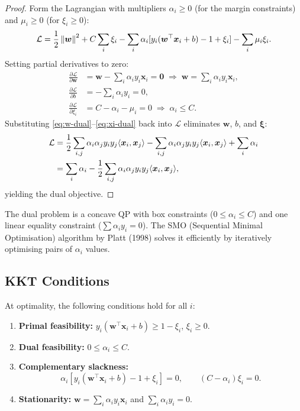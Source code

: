 \begin{proof}
Form the Lagrangian with multipliers $\alpha_i \geq 0$ (for the margin constraints) and $\mu_i \geq 0$ (for $\xi_i \geq 0$):
\[
    \mathcal{L} = \frac{1}{2}\left\| \bm{w} \right\|^2 + C\sum_i\xi_i
    - \sum_i\alpha_i[y_i(\bm{w}^\top\bm{x}_i+b)-1+\xi_i]
    - \sum_i\mu_i\xi_i.
\]
Setting partial derivatives to zero:
\begin{align}
    \frac{\partial\mathcal{L}}{\partial\bm{w}} &= \bm{w} - \sum_i\alpha_i y_i\bm{x}_i = \bm{0}
    \;\Longrightarrow\; \bm{w} = \sum_i\alpha_i y_i\bm{x}_i, \label{eq:w-dual}\\
    \frac{\partial\mathcal{L}}{\partial b} &= -\sum_i\alpha_i y_i = 0, \label{eq:b-dual}\\
    \frac{\partial\mathcal{L}}{\partial\xi_i} &= C - \alpha_i - \mu_i = 0
    \;\Longrightarrow\; \alpha_i \leq C. \label{eq:xi-dual}
\end{align}
Substituting \eqref{eq:w-dual}--\eqref{eq:xi-dual} back into $\mathcal{L}$ eliminates $\bm{w}$, $b$, and $\bm{\xi}$:
\begin{align*}
    \mathcal{L} &= \frac{1}{2}\sum_{i,j}\alpha_i\alpha_j y_i y_j\langle \bm{x}_i, \bm{x}_j \rangle - \sum_{i,j}\alpha_i\alpha_j y_i y_j\langle \bm{x}_i, \bm{x}_j \rangle + \sum_i\alpha_i\\
    &= \sum_i\alpha_i - \frac{1}{2}\sum_{i,j}\alpha_i\alpha_j y_i y_j\langle \bm{x}_i, \bm{x}_j \rangle,
\end{align*}
yielding the dual objective.
\end{proof}

\begin{remark}
The dual problem is a concave QP with box constraints ($0 \leq \alpha_i \leq C$) and one linear equality constraint ($\sum \alpha_i y_i = 0$). The SMO (Sequential Minimal Optimisation) algorithm by Platt (1998) solves it efficiently by iteratively optimising pairs of $\alpha_i$ values.
\end{remark}

\subsection{KKT Conditions}

\begin{theorem}
At optimality, the following conditions hold for all $i$:
\begin{enumerate}
    \item \textbf{Primal feasibility:} $y_i(\bm{w}^\top\bm{x}_i+b) \geq 1-\xi_i$, $\xi_i \geq 0$.
    \item \textbf{Dual feasibility:} $0 \leq \alpha_i \leq C$.
    \item \textbf{Complementary slackness:}
    \[
        \alpha_i[y_i(\bm{w}^\top\bm{x}_i+b)-1+\xi_i] = 0,
        \qquad (C-\alpha_i)\xi_i = 0.
    \]
    \item \textbf{Stationarity:} $\bm{w} = \sum_i \alpha_i y_i \bm{x}_i$ and $\sum_i \alpha_i y_i = 0$.
\end{enumerate}
\end{theorem}

